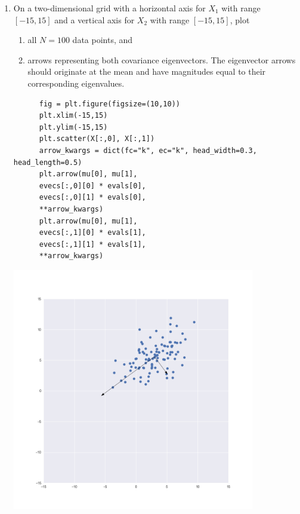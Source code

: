 \begin{enumerate}[label=(\alph*)]
\newpage
\item On a two-dimensional grid with a horizontal axis for $X_1$ with range $[-15, 15]$ and a vertical axis for $X_2$ with range $[-15, 15]$, plot
  \begin{enumerate}[label=(\roman*)]
  \item all $N=100$ data points, and
  \item arrows representing both covariance eigenvectors. The eigenvector arrows should originate at the mean and have magnitudes equal to their corresponding eigenvalues.
  \end{enumerate}
  \begin{mdframed}
    \begin{verbatim}
      fig = plt.figure(figsize=(10,10))
      plt.xlim(-15,15)
      plt.ylim(-15,15)
      plt.scatter(X[:,0], X[:,1])
      arrow_kwargs = dict(fc="k", ec="k", head_width=0.3, head_length=0.5)
      plt.arrow(mu[0], mu[1],
      evecs[:,0][0] * evals[0],
      evecs[:,0][1] * evals[0],
      **arrow_kwargs)
      plt.arrow(mu[0], mu[1],
      evecs[:,1][0] * evals[1],
      evecs[:,1][1] * evals[1],
      **arrow_kwargs)
    \end{verbatim}
    \includegraphics[width=300pt]{img/hw03_3d.png}
  \end{mdframed}


\end{enumerate}
